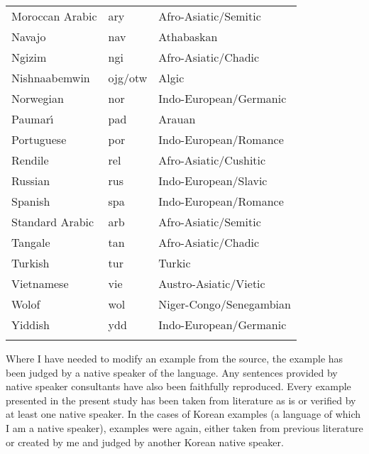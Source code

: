 \begin{table}
\begin{tabularx}{\textwidth}{XXX}
Moroccan Arabic & ary & Afro-Asiatic/Semitic \\ 
Navajo & nav & Athabaskan \\ 
Ngizim & ngi & Afro-Asiatic/Chadic \\ 
Nishnaabemwin & ojg/otw & Algic \\ 
Norwegian & nor & Indo-European/Germanic \\ 
Paumar{\'{\i}} & pad & Arauan \\ 
Portuguese & por & Indo-European/Romance \\ 
Rendile & rel & Afro-Asiatic/Cushitic \\ 
Russian & rus & Indo-European/Slavic \\ 
Spanish & spa & Indo-European/Romance \\ 
Standard Arabic & arb & Afro-Asiatic/Semitic \\ 
Tangale & tan & Afro-Asiatic/Chadic \\ 
Turkish & tur & Turkic \\ 
Vietnamese & vie & Austro-Asiatic/Vietic \\ 
Wolof & wol & Niger-Congo/Senegambian \\ 
Yiddish & ydd & Indo-European/Germanic \\ 
\lspbottomrule
\end{tabularx}
\end{table}


Where I have needed to modify an example from the source, the example
has been judged by a native speaker of the language.  Any sentences
provided by native speaker consultants have also been faithfully
reproduced.  Every example presented in the present study has been
taken from literature as is or verified by at least one native
speaker. In the cases of Korean examples (a language of which I am a
native speaker), examples were again, either taken from previous
literature or created by me and judged by another Korean native
speaker.


